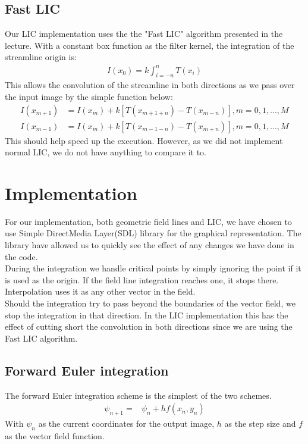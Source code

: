 \documentclass[11pt,a4paper,english]{article}
\numberwithin{equation}{section}
\begin{document}
\subsection{Fast LIC}
Our LIC implementation uses the the "Fast LIC" algorithm presented in the lecture. With a constant box function as the filter kernel, the integration of the streamline origin is: \\
\begin{align*}
	I(x_0) = k \int^{n}_{i = -n}T(x_i)
\end{align*}
This allows the convolution of the streamline in both directions as we pass over the input image by the simple function below:
\begin{align*}
	I(x_{m+1}) &= I(x_m) + k[T(x_{m+1+n}) - T(x_{m-n})], m = 0, 1,..., M	\\
	I(x_{m-1}) &= I(x_m) + k[T(x_{m-1-n}) - T(x_{m+n})], m = 0, 1,..., M
\end{align*}
This should help speed up the execution. However, as we did not implement normal LIC, we do not have anything to compare it to.

\section{Implementation}
For our implementation, both geometric field lines and LIC, we have chosen to use Simple DirectMedia Layer(SDL) library for the graphical representation. The library have allowed us to quickly see the effect of any changes we have done in the code.
\\
During the integration we handle critical points by simply ignoring the point if it is used as the origin. If the field line integration reaches one, it stops there. Interpolation uses it as any other vector in the field.
\\
Should the integration try to pass beyond the boundaries of the vector field, we stop the integration in that direction. In the LIC implementation this has the effect of cutting short the convolution in both directions since we are using the Fast LIC algorithm.

\subsection{Forward Euler integration}
The forward Euler integration scheme is the simplest of the two schemes. 
\begin{align*}
	\psi_{n+1} =& \psi_n + hf(x_n, y_n)
\end{align*}
With $\psi_n$ as the current coordinates for the output image, $h$ as the step size and $f$ as the vector field function.
\end{document}
